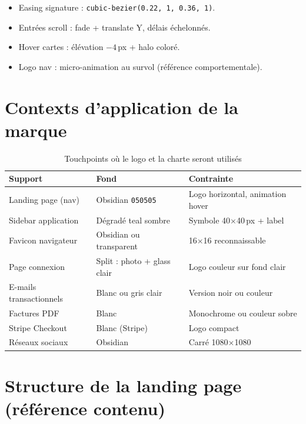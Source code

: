 \documentclass[11pt,a4paper]{report}
\newcommand{\hex}[1]{\texttt{\small #1}}
\begin{document}
\begin{itemize}[leftmargin=*]
    \item Easing signature : \texttt{cubic-bezier(0.22, 1, 0.36, 1)}.
    \item Entrées scroll : fade + translate Y, délais échelonnés.
    \item Hover cartes : élévation $-4$\,px + halo coloré.
    \item Logo nav : micro-animation au survol (référence comportementale).
\end{itemize}

\chapter{Contexts d'application de la marque}

\begin{table}[h]
\centering
\caption{Touchpoints où le logo et la charte seront utilisés}
\begin{tabular}{@{}p{4cm}p{4cm}p{6cm}@{}}
\toprule
\textbf{Support} & \textbf{Fond} & \textbf{Contrainte} \\
\midrule
Landing page (nav) & Obsidian \hex{050505} & Logo horizontal, animation hover \\
Sidebar application & Dégradé teal sombre & Symbole 40$\times$40\,px + label \\
Favicon navigateur & Obsidian ou transparent & 16$\times$16 reconnaissable \\
Page connexion & Split : photo + glass clair & Logo couleur sur fond clair \\
E-mails transactionnels & Blanc ou gris clair & Version noir ou couleur \\
Factures PDF & Blanc & Monochrome ou couleur sobre \\
Stripe Checkout & Blanc (Stripe) & Logo compact \\
Réseaux sociaux & Obsidian & Carré 1080$\times$1080 \\
\bottomrule
\end{tabular}
\end{table}

\chapter{Structure de la landing page (référence contenu)}
\end{document}
